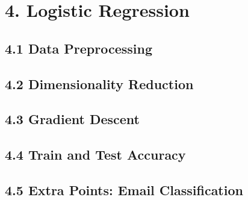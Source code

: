 \documentclass[12pt]{article}
\begin{document}
\section*{4. Logistic Regression}
\subsection*{4.1 Data Preprocessing}
\subsection*{4.2 Dimensionality Reduction}
\subsection*{4.3 Gradient Descent}
\subsection*{4.4 Train and Test Accuracy}
\subsection*{4.5 Extra Points: Email Classification}
\end{document}
